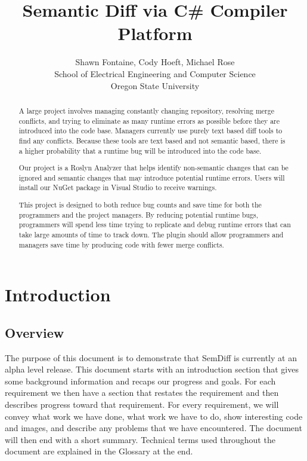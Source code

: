 \documentclass[10pt,draftclsnofoot,onecolumn]{IEEEtran}
\begin{document}
\title{Semantic Diff via C\# Compiler Platform}

\author{Shawn Fontaine, Cody Hoeft, Michael Rose\\
	School of Electrical Engineering and Computer Science\\
	Oregon State University}

\maketitle
\thispagestyle{empty} %


\begin{abstract}
A large project involves managing constantly changing repository, resolving merge conflicts, and trying to eliminate as many runtime errors as possible before they are introduced into the code base. Managers currently use purely text based diff tools to find any conflicts. Because these tools are text based and not semantic based, there is a higher probability that a runtime bug will be introduced into the code base.

Our project is a Roslyn Analyzer that helps identify non-semantic changes that can be ignored and semantic changes that may introduce potential runtime errors. Users will install our NuGet package in Visual Studio to receive warnings.

This project is designed to both reduce bug counts and save time for both the programmers and the project managers. By reducing potential runtime bugs, programmers will spend less time trying to replicate and debug runtime errors that can take large amounts of time to track down. The plugin should allow programmers and managers save time by producing code with fewer merge conflicts.
\end{abstract}
\newpage
\setcounter{page}{1}

\section{Introduction}
\subsection{Overview}
The purpose of this document is to demonstrate that SemDiff is currently at an alpha level release. This document starts with an introduction section that gives some background information and recaps our progress and goals. For each requirement we then have a section that restates the requirement and then describes progress toward that requirement. For every requirement, we will convey what work we have done, what work we have to do, show interesting code and images, and describe any problems that we have encountered. The document will then end with a short summary. Technical terms used throughout the document are explained in the Glossary at the end.
\end{document}

